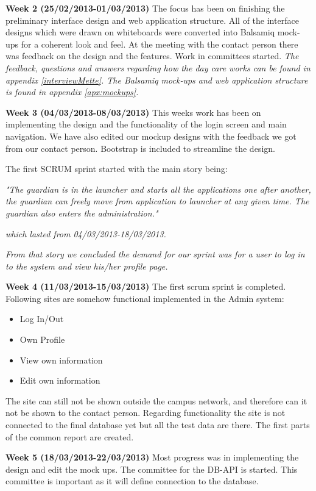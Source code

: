 \textbf{Week 2 (25/02/2013-01/03/2013)}
The focus has been on finishing the preliminary interface design and web application structure.
All of the interface designs which were drawn on whiteboards were converted into Balsamiq mock-ups for a coherent look and feel.
At the meeting with the contact person there was feedback on the design and the features. 
Work in committees started. 
\textit{The feedback, questions and answers regarding how the day care works can be found in appendix \vref{interviewMette}.
The Balsamiq mock-ups and web application structure is found in appendix \vref{apx:mockups}.}

\textbf{Week 3 (04/03/2013-08/03/2013)}
This weeks work has been on implementing the design and the functionality of the login screen and main navigation.  
We have also edited our mockup designs with the feedback we got from our contact person. 
Bootstrap is included to streamline the design. 

The first SCRUM sprint  started with the main story being:

\textit{"The guardian is in the launcher and starts all the applications one after another, the guardian can freely move from application to launcher at any given time.
The guardian also enters the administration."}

\textit{which lasted from 04/03/2013-18/03/2013.} 

\textit{From that story we concluded the demand for our sprint was for a user to log in to the system and view his/her profile page. }

\textbf{Week 4 (11/03/2013-15/03/2013) }
The first scrum sprint is completed. 
Following sites are somehow functional implemented in the Admin system:
\begin{itemize}
        \item Log In/Out
        \item Own Profile
        \item View own information
        \item Edit own information
\end{itemize}
The site can still not be shown outside the campus network, and therefore can it not be shown to the contact person.
Regarding functionality the site is not connected to the final database yet but all the test data are there.  
The first parts of the common report are created.

\textbf{Week 5 (18/03/2013-22/03/2013)}
Most progress was in implementing the design and edit the mock ups. The committee for the DB-API is started. This committee is important as it will define connection to the database. 

